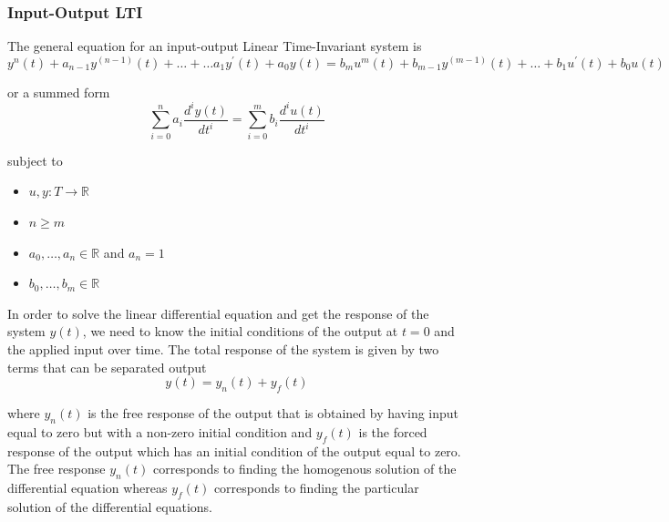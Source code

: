 \documentclass[11pt]{article}
\begin{document}
\subsubsection{Input-Output LTI}
The general equation for an input-output Linear Time-Invariant system is
\begin{equation}
  y^n(t) + a_{n-1}y^(n-1)(t) + \dots + \dots a_1 y^\prime (t) + a_0 y(t) = b_m u^m (t) + b_{m-1} y^(m-1) (t) + \dots + b_1 u^\prime (t) + b_0 u(t)
\end{equation}

or a summed form
\begin{equation}
  \sum_{i=0}^n a_i \frac{d^i y(t)}{d t^i } = \sum_{i=0}^{m} b_i \frac{d^i u(t)}{d  t^i} 
\end{equation}

subject to 
\begin{itemize}
  \item $u,y : T \rightarrow \mathbb{R}$
  \item $n \geq m$
  \item $a_0, \dots, a_n \in \mathbb{R}$ and $a_n=1$
  \item $b_0, \dots, b_m \in \mathbb{R}$
\end{itemize}

In order to solve the linear differential equation and get the response of the system $y(t)$, we need to know the initial conditions of the output at $t=0$ and the applied input over time.
The total response of the system is given by two terms that can be separated output
\begin{equation}
  y(t) = y_n(t) + y_f(t)
\end{equation}

where $y_n(t)$ is the free response of the output that is obtained by having input equal to zero but with a non-zero initial condition and $y_f(t)$ is the forced response of the output which has an initial condition of the output equal to zero.
The free response $y_n(t)$ corresponds to finding the homogenous solution of the differential equation whereas $y_f (t)$ corresponds to finding the particular solution of the differential equations.
\end{document}
